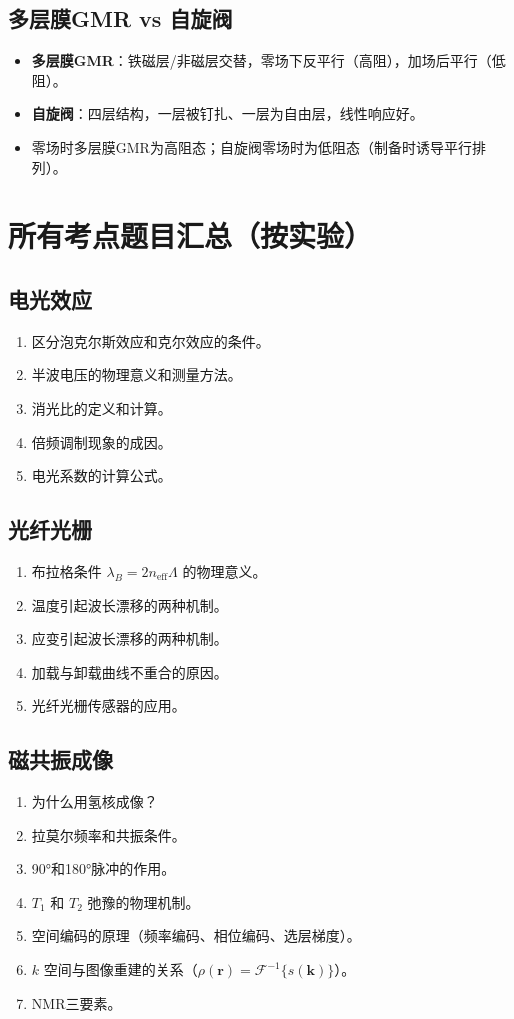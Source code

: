 \documentclass[12pt,a4paper]{article}
\begin{document}
\subsection{多层膜GMR vs 自旋阀}
\begin{itemize}
    \item \textbf{多层膜GMR}：铁磁层/非磁层交替，零场下反平行（高阻），加场后平行（低阻）。
    \item \textbf{自旋阀}：四层结构，一层被钉扎、一层为自由层，线性响应好。
    \item 零场时多层膜GMR为高阻态；自旋阀零场时为低阻态（制备时诱导平行排列）。
\end{itemize}

\section{所有考点题目汇总（按实验）}

\subsection*{电光效应}
\begin{enumerate}
    \item 区分泡克尔斯效应和克尔效应的条件。
    \item 半波电压的物理意义和测量方法。
    \item 消光比的定义和计算。
    \item 倍频调制现象的成因。
    \item 电光系数的计算公式。
\end{enumerate}

\subsection*{光纤光栅}
\begin{enumerate}
    \item 布拉格条件 \(\lambda_B = 2n_{\text{eff}}\Lambda\) 的物理意义。
    \item 温度引起波长漂移的两种机制。
    \item 应变引起波长漂移的两种机制。
    \item 加载与卸载曲线不重合的原因。
    \item 光纤光栅传感器的应用。
\end{enumerate}

\subsection*{磁共振成像}
\begin{enumerate}
    \item 为什么用氢核成像？
    \item 拉莫尔频率和共振条件。
    \item 90°和180°脉冲的作用。
    \item \(T_1\) 和 \(T_2\) 弛豫的物理机制。
    \item 空间编码的原理（频率编码、相位编码、选层梯度）。
    \item \(k\) 空间与图像重建的关系（\(\rho(\mathbf{r}) = \mathcal{F}^{-1}\{s(\mathbf{k})\}\)）。
    \item NMR三要素。
\end{enumerate}
\end{document}
